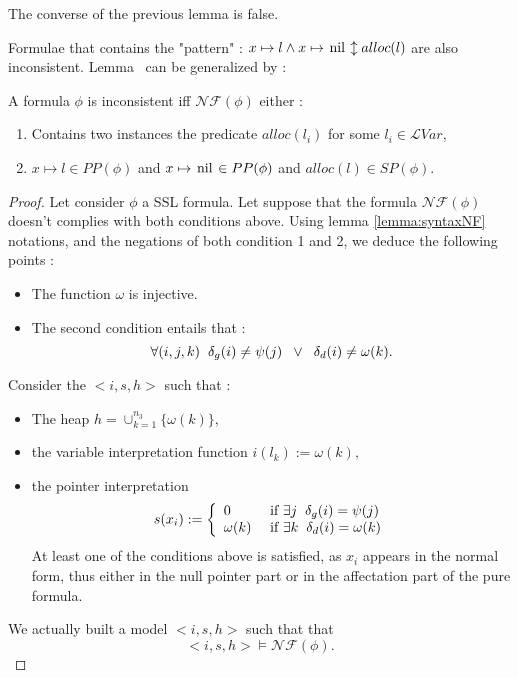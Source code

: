 \documentclass[a4paper,twoside,12pt]{report}
\newcommand\LVar{\mathcal{L}Var} %
\newcommand{\Pp}[1]{PP(#1)} %
\newcommand{\Sp}[1]{SP(#1)} %
\newcommand{\Alloc}[1]{alloc(#1)}
\newcommand{\Andpure}[2]{ #1 \wedge #2}
\newcommand{\Pointsto}[2]{ #1 \mapsto #2}
\newcommand{\nil}[0]{\lstinline!nil!}
\newcommand{\Pointstonil}[1]{ #1 \mapsto \mbox{\nil}}
\newcommand{\Formula}[2]{ #1  \updownarrow #2}
\newcommand{\NForm}[1]{\mathcal{NF}(#1)}
\begin{document}
The converse of the previous lemma is false.

Formulae that contains the "pattern" : $\Formula{\Andpure{\Pointsto{x}{l}}{\Pointstonil{x}}}{\Alloc{l}}$ are also inconsistent.
Lemma \label{lemma:syntaxNF}~can be generalized by : 

\begin{lemma}
A formula $\phi$ is inconsistent iff $\NForm{\phi}$  either : 
\begin{enumerate}
\item Contains two instances the predicate $\Alloc{l_i}$ for some  $l_i\in \LVar$,
\item  $\Pointsto{x}{l}\in \Pp{\phi}$ and $\Pointstonil{x}\in \Pp{\phi}$ and $\Alloc{l}\in \Sp{\phi}.$
\end{enumerate}
\end{lemma}

\begin{proof}


Let consider $\phi$ a SSL formula. Let suppose that the formula $\NForm{\phi}$
doesn't complies with both conditions above.
Using lemma \ref{lemma:syntaxNF} notations, and the negations of both condition 1 and 2, we deduce the following points :
\begin{itemize}
\item The function $\omega$ is injective.  
\item The second condition entails that :
$$\forall (i,j,k) \hspace{2mm} \delta_g(i)\neq \psi(j) \hspace{2mm} \vee \hspace{2mm} \delta_d(i) \neq \omega(k).$$ 
\end{itemize} 

Consider the $<i,s,h>$ such that :
\begin{itemize}
\item The heap $h=\cup_{k=1}^{n_3} \{\omega(k)\},$
\item the variable interpretation function $i(l_k):= \omega(k),$
\item the pointer interpretation $$s(x_i) := 
	\left \{ 
	\begin{array}{ll} 
	0 & \text{ if } \exists j \hspace{2mm} \delta_g(i) = \psi(j) \\
	\omega(k) & \text{ if } \exists k \hspace{2mm} \delta_d(i) = \omega(k)
	\end{array}
	\right .$$
At least one of the conditions above is satisfied, as $x_i$ 
appears in the normal form, thus either in the null pointer part or
in the affectation part of the pure formula.
\end{itemize}

We actually built a  model $<i,s,h>$  such that
that $$<i,s,h> \models \NForm{\phi}.$$
\end{proof}
\end{document}
